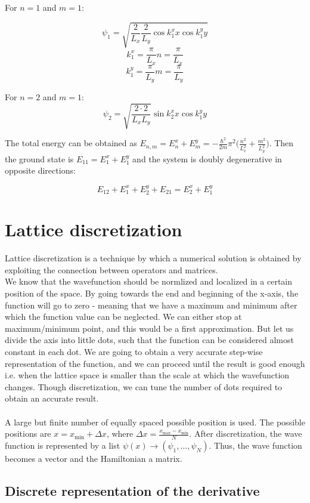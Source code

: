   For $n=1$ and $m=1$:

  $$\psi_1 = \sqrt{\frac{2}{L_{x}}\frac{2}{L_{y}} \cos k_1^x x \cos k_1^y y}$$
  $$k_1^x = \frac{\pi}{L_{x}} n = \frac{\pi}{L_{x}}$$
  $$k_1^y = \frac{\pi}{L_{y}} m = \frac{\pi}{L_{y}}$$

  For $n=2$ and $m=1$:
  $$\psi_2 = \sqrt{\frac{2 \cdot 2}{L_{x}L_{y}}} \sin k_2^x x \cos k_1^y y$$

  The total energy can be obtained as $E_{n,m} = E_n^x+E_m^y = -\frac{\hbar^2}{2m}\pi^2\biggl(\frac{n^2}{L_x^2}+\frac{m^2}{L_y^2}\biggr)$.
  Then the ground state is $E_{11} = E_1^x+E_1^y$ and the system is doubly degenerative in opposite directions:

  $$E_{12} + E_1^x+E_2^y + E_{21} = E_2^x+E_1^y$$

\section{Lattice discretization}
Lattice discretization is a technique by which a numerical solution is obtained by exploiting the connection between operators and matrices.\\

\noindent
We know that the wavefunction should be normlized and localized in a certain position of the space. 
By going towards the end and beginning of the x-axis, the function will go to zero - meaning that we have a maximum and minimum after which the function value can be neglected. 
We can either stop at maximum/minimum point, and this would be a first approximation. 
But let us divide the axis into little dots, such that the function can be considered almost constant in each dot. 
We are going to obtain a very accurate step-wise representation of the function,  and we can proceed until the result is good enough i.e. when the lattice space is smaller than the scale at which the wavefunction changes. 
Though discretization, we can tune the number of dots required to obtain an accurate result.\\
\\
\noindent
A large but finite number of equally spaced possible position is used. 
The possible positions are $x = x_{\min} + \Delta x$, where $\Delta x = \frac{x_{\max}-x_{\min}}{N}$.
After discretization, the wave function is represented by a list $\psi(x) \rightarrow(\psi_1,\dots, \psi_N)$.
Thus, the wave function becomes a vector and the Hamiltonian a matrix.

  \subsection{Discrete representation of the derivative}

